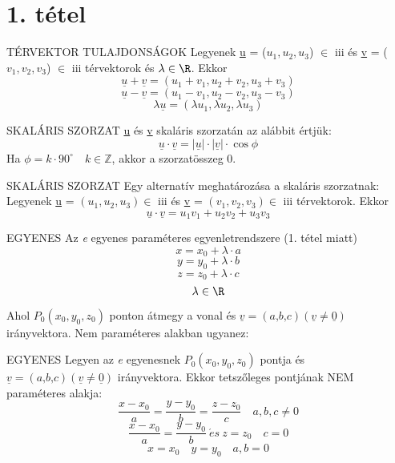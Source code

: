 \section{1. tétel}

\begin{tetel}{TÉRVEKTOR TULAJDONSÁGOK}
Legyenek \underline{u} = ($u_1, u_2, u_3$) $\in$ \Rn{3} és \underline{v} = ($v_1, v_2, v_3$) $\in$ \Rn{3} térvektorok és $\lambda \in \R$. Ekkor\\
$$\underline{u} + \underline{v} = (u_1 + v_1, u_2 + v_2, u_3 + v_3)$$
$$\underline{u} - \underline{v} = (u_1 - v_1, u_2 - v_2, u_3 - v_3)$$
$$\lambda \underline{u} = (\lambda u_1,\lambda u_2, \lambda u_3)$$
\end{tetel}

\begin{definicio}{SKALÁRIS SZORZAT}
\underline{u} és \underline{v} skaláris szorzatán az alábbit értjük:
$$\underline{u}\cdot\underline{v} = |\underline{u}|\cdot|\underline{v}|\cdot\cos\phi$$
Ha $\phi = k\cdot90^{\circ}\quad k\in\mathbb{Z}$, akkor a szorzatösszeg 0.
\end{definicio}

\begin{tetel}{SKALÁRIS SZORZAT}
Egy alternatív meghatározása a skaláris szorzatnak: \\Legyenek \underline{u} = $(u_1, u_2, u_3)\in$ \Rn{3} és \underline{v} = $(v_1, v_2, v_3)\in$ \Rn{3} térvektorok. Ekkor $$\underline{u}\cdot\underline{v} = u_1 v_1 + u_2 v_2 + u_3 v_3$$
\end{tetel}

\begin{tetel}{EGYENES}
Az \textit{e} egyenes paraméteres egyenletrendszere (1. tétel miatt)
$$x = x_0 + \lambda \cdot a$$
$$y = y_0 + \lambda \cdot b$$
$$z = z_0 + \lambda \cdot c$$
$$\lambda \in \R$$
\end{tetel}

Ahol $P_0 (x_0,y_0,z_0)$ ponton átmegy a vonal és $\underline{v} = (\textit{a,b,c})  (\underline{v} \neq \underline{0})$ irányvektora.
Nem paraméteres alakban ugyanez:

\begin{tetel}{EGYENES}
Legyen az \textit{e} egyenesnek $P_0 (x_0,y_0,z_0)$ pontja és $\underline{v} = (\textit{a,b,c})  (\underline{v} \neq \underline{0})$ irányvektora. Ekkor tetszőleges pontjának NEM paraméteres alakja:
$$\frac{x-x_0}{a} = \frac{y-y_0}{b} = \frac{z-z_0}{c}\quad a, b, c \neq 0$$
$$\frac{x-x_0}{a} = \frac{y-y_0}{b} \:\acute{e}s\: z = z_0 \quad c = 0$$
$$x = x_0\quad y = y_0\quad a,b = 0$$
\end{tetel}

